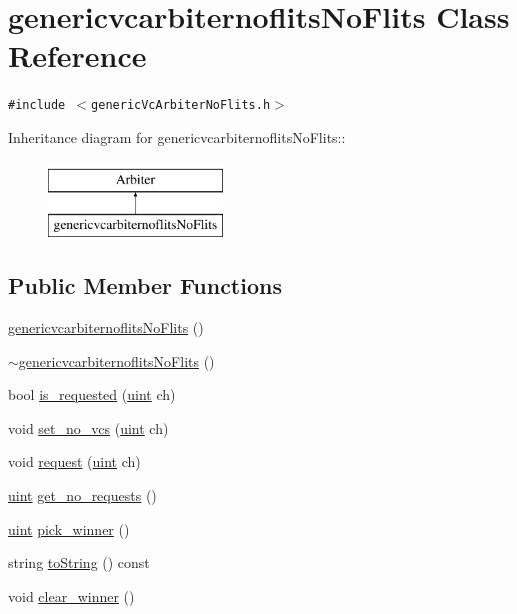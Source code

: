 \hypertarget{classgenericvcarbiternoflitsNoFlits}{
\section{genericvcarbiternoflitsNoFlits Class Reference}
\label{classgenericvcarbiternoflitsNoFlits}
}
{\tt \#include $<$genericVcArbiterNoFlits.h$>$}

Inheritance diagram for genericvcarbiternoflitsNoFlits::\begin{figure}[H]
\begin{center}
\leavevmode
\includegraphics[height=2cm]{classgenericvcarbiternoflitsNoFlits}
\end{center}
\end{figure}
\subsection*{Public Member Functions}
\begin{CompactItemize}
\item 
\hyperlink{classgenericvcarbiternoflitsNoFlits_db66d29bba61a5e4bf3ef5ec5d61ce15}{genericvcarbiternoflitsNoFlits} ()
\item 
\hyperlink{classgenericvcarbiternoflitsNoFlits_337ead5b3dee13995af1c6636f7f3670}{$\sim$genericvcarbiternoflitsNoFlits} ()
\item 
bool \hyperlink{classgenericvcarbiternoflitsNoFlits_9a0299945d0e4d627534ffcfd06a8921}{is\_\-requested} (\hyperlink{outputBuffer_8h_91ad9478d81a7aaf2593e8d9c3d06a14}{uint} ch)
\item 
void \hyperlink{classgenericvcarbiternoflitsNoFlits_6d61b38c12a4dcae8137849232106541}{set\_\-no\_\-vcs} (\hyperlink{outputBuffer_8h_91ad9478d81a7aaf2593e8d9c3d06a14}{uint} ch)
\item 
void \hyperlink{classgenericvcarbiternoflitsNoFlits_679b8b6bc3be8c5e28635939a10ee2b7}{request} (\hyperlink{outputBuffer_8h_91ad9478d81a7aaf2593e8d9c3d06a14}{uint} ch)
\item 
\hyperlink{outputBuffer_8h_91ad9478d81a7aaf2593e8d9c3d06a14}{uint} \hyperlink{classgenericvcarbiternoflitsNoFlits_21ef6c560a4408fb9233416f384ec434}{get\_\-no\_\-requests} ()
\item 
\hyperlink{outputBuffer_8h_91ad9478d81a7aaf2593e8d9c3d06a14}{uint} \hyperlink{classgenericvcarbiternoflitsNoFlits_8d28e69dbcb2e4bd1bce785ade0b4573}{pick\_\-winner} ()
\item 
string \hyperlink{classgenericvcarbiternoflitsNoFlits_0cbe88bbc52325a3f4301bcca576e2ea}{toString} () const 
\item 
void \hyperlink{classgenericvcarbiternoflitsNoFlits_27217b32212845d3c7e3dfe4a87715c4}{clear\_\-winner} ()
\end{CompactItemize}
